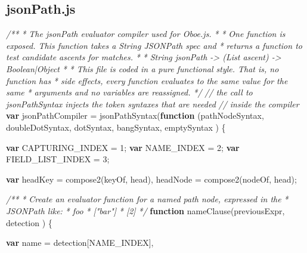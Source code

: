 \documentclass[12pt, ]{article}
\newenvironment{Shaded}{}{}
\newcommand{\KeywordTok}[1]{\textcolor[rgb]{0.00,0.44,0.13}{\textbf{{#1}}}}
\newcommand{\DecValTok}[1]{\textcolor[rgb]{0.25,0.63,0.44}{{#1}}}
\newcommand{\CommentTok}[1]{\textcolor[rgb]{0.38,0.63,0.69}{\textit{{#1}}}}
\newcommand{\FunctionTok}[1]{\textcolor[rgb]{0.02,0.16,0.49}{{#1}}}
\newcommand{\NormalTok}[1]{{#1}}
\begin{document}
\pagebreak

\subsection{jsonPath.js}\label{headerux5fjsonPath}

\label{src_jsonPath}

\begin{Shaded}
\begin{Highlighting}[]
\CommentTok{/**}
\CommentTok{ * The jsonPath evaluator compiler used for Oboe.js. }
\CommentTok{ * }
\CommentTok{ * One function is exposed. This function takes a String JSONPath spec and }
\CommentTok{ * returns a function to test candidate ascents for matches.}
\CommentTok{ * }
\CommentTok{ *  String jsonPath -> (List ascent) -> Boolean|Object}
\CommentTok{ *}
\CommentTok{ * This file is coded in a pure functional style. That is, no function has }
\CommentTok{ * side effects, every function evaluates to the same value for the same }
\CommentTok{ * arguments and no variables are reassigned.}
\CommentTok{ */}  
\CommentTok{// the call to jsonPathSyntax injects the token syntaxes that are needed }
\CommentTok{// inside the compiler}
\KeywordTok{var} \NormalTok{jsonPathCompiler = }\FunctionTok{jsonPathSyntax}\NormalTok{(}\KeywordTok{function} \NormalTok{(pathNodeSyntax, }
                                                \NormalTok{doubleDotSyntax, }
                                                \NormalTok{dotSyntax,}
                                                \NormalTok{bangSyntax,}
                                                \NormalTok{emptySyntax ) \{}

   \KeywordTok{var} \NormalTok{CAPTURING_INDEX = }\DecValTok{1}\NormalTok{;}
   \KeywordTok{var} \NormalTok{NAME_INDEX = }\DecValTok{2}\NormalTok{;}
   \KeywordTok{var} \NormalTok{FIELD_LIST_INDEX = }\DecValTok{3}\NormalTok{;}

   \KeywordTok{var} \NormalTok{headKey  = }\FunctionTok{compose2}\NormalTok{(keyOf, head),}
       \NormalTok{headNode = }\FunctionTok{compose2}\NormalTok{(nodeOf, head);}
                   
   \CommentTok{/**}
\CommentTok{    * Create an evaluator function for a named path node, expressed in the}
\CommentTok{    * JSONPath like:}
\CommentTok{    *    foo}
\CommentTok{    *    ["bar"]}
\CommentTok{    *    [2]   }
\CommentTok{    */}
   \KeywordTok{function} \FunctionTok{nameClause}\NormalTok{(previousExpr, detection ) \{}
     
      \KeywordTok{var} \NormalTok{name = detection[NAME_INDEX],}
            

\end{Highlighting}
\end{Shaded}
\end{document}
